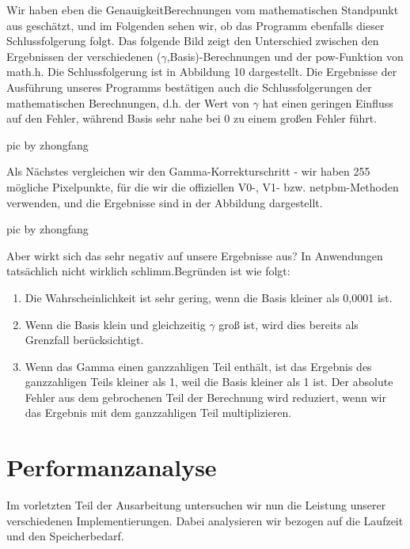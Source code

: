 \documentclass[course=erap]{aspdoc}
\begin{document}
\par
Wir haben eben die GenauigkeitBerechnungen vom mathematischen Standpunkt aus geschätzt, und im Folgenden sehen wir, ob das Programm ebenfalls dieser Schlussfolgerung folgt. Das folgende Bild zeigt den Unterschied zwischen den Ergebnissen der verschiedenen ($\gamma$,Basis)-Berechnungen und der pow-Funktion von math.h. Die Schlussfolgerung ist in Abbildung 10 dargestellt. Die Ergebnisse der Ausführung unseres Programms bestätigen auch die Schlussfolgerungen der mathematischen Berechnungen, d.h. der Wert von $\gamma$ hat einen geringen Einfluss auf den Fehler, während Basis sehr nahe bei 0 zu einem großen Fehler führt.

\par
pic by zhongfang

\par
Als Nächstes vergleichen wir den Gamma-Korrekturschritt - wir haben 255 mögliche Pixelpunkte, für die wir die offiziellen V0-, V1- bzw. netpbm-Methoden verwenden, und die Ergebnisse sind in der Abbildung dargestellt.

\par
pic by zhongfang

\par
Aber wirkt sich das sehr negativ auf unsere Ergebnisse aus? In Anwendungen tatsächlich nicht wirklich schlimm.Begründen ist wie folgt:
\begin{enumerate}
\item Die Wahrscheinlichkeit ist sehr gering, wenn die Basis kleiner als 0,0001 ist.
\item Wenn die Basis klein und gleichzeitig $\gamma$ groß ist, wird dies bereits als Grenzfall berücksichtigt.
\item Wenn das Gamma einen ganzzahligen Teil enthält, ist das Ergebnis des ganzzahligen Teils kleiner als 1, weil die Basis kleiner als 1 ist. Der absolute Fehler aus dem gebrochenen Teil der Berechnung wird reduziert, wenn wir das Ergebnis mit dem ganzzahligen Teil multiplizieren.
\end{enumerate}


\section{Performanzanalyse}
\par
Im vorletzten Teil der Ausarbeitung untersuchen wir nun die Leistung unserer verschiedenen Implementierungen. Dabei analysieren wir bezogen auf die Laufzeit und den Speicherbedarf.
\end{document}
